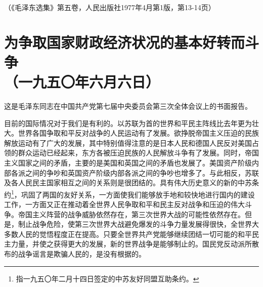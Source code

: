 \documentclass[cn,11pt,chinese]{elegantbook}
\def\myformat#1{\hfil\hfil #1}
\begin{document}
\begin{flushright}（《毛泽东选集》第五卷，人民出版社1977年4月第1版，第13-14页）\end{flushright}
\newpage\section*{\myformat{为争取国家财政经济状况的基本好转而斗争}\\\myformat{（一九五〇年六月六日）}}
\begin{introduction}\item  这是毛泽东同志在中国共产党第七届中央委员会第三次全体会议上的书面报告。\end{introduction}
目前的国际情况对于我们是有利的。以苏联为首的世界和平民主阵线比去年更为壮大。世界各国争取和平反对战争的人民运动有了发展。欲挣脱帝国主义压迫的民族解放运动有了广大的发展，其中特别值得注意的是日本人民和德国人民反对美国占领的群众运动已经起来，东方各被压迫民族的人民解放斗争有了发展。同时，帝国主义国家之间的矛盾，主要的是美国和英国之间的矛盾也发展了。美国资产阶级内部各派之间的争吵和英国资产阶级内部各派之间的争吵也增多了。与此相反，苏联及各人民民主国家相互之间的关系则是很团结的。具有伟大历史意义的新的中苏条约\footnote[1]{指一九五〇年二月十四日签定的中苏友好同盟互助条约。}，巩固了两国的友好关系，一方面使我们能够放手地和较快地进行国内的建设工作，一方面又正在推动着全世界人民争取和平和民主反对战争和压迫的伟大斗争。帝国主义阵营的战争威胁依然存在，第三次世界大战的可能性依然存在。但是，制止战争危险，使第三次世界大战避免爆发的斗争力量发展得很快，全世界大多数人民的觉悟程度正在提高。只要全世界共产党能够继续团结一切可能的和平民主力量，并使之获得更大的发展，新的世界战争是能够制止的。国民党反动派所散布的战争谣言是欺骗人民的，是没有根据的。\\
\end{document}
